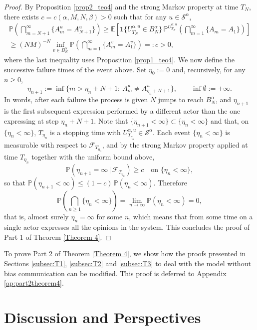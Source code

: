 \documentclass[11pt]{article}
\theoremstyle{definition}
\newcommand{\st}{\mathcal{S}}
\def\P{{\mathbb P}}
\begin{document}
\begin{proof}
By Proposition \ref{prop2_teo4} and the strong Markov property at time $T_N$, there exists $c=c(\alpha,M,N,\beta)>0$ such that for any $u\in \st^{\alpha}$,
\begin{multline*}
\P\left(\bigcap_{m=N+1}^{\infty}\{A_m^{u}=A_{N+1}^{u}\}\right) \geq
\mathbb{E}\left[\mathbf{1}\{U_{T_N}^{\alpha,u} \in B_N^{\alpha}\}\,
\P^{U_{T_N}^{\alpha,u}}\left(\bigcap_{m=1}^{\infty}\{A_m=A_1\}\right)\right]\\
\geq (NM)^{-N}\inf_{v \in B_N^{\alpha}}\P\left(\bigcap_{m=1}^{\infty}\{A^v_m=A^v_1\}\right)=:c>0,
\end{multline*}
where the last inequality uses Proposition \ref{prop1_teo4}. We now define the successive failure times of the event above. Set
$\eta_0 := 0$ and, recursively, for any $n \geq 0$,
\[
\eta_{n+1} := \inf\big\{ m > \eta_n + N + 1 :\ A^{u}_{m} \neq A^{u}_{\eta_n + N + 1} \big\},
\qquad \inf \emptyset := +\infty .
\]
In words, after each failure the process is given $N$ jumps to reach $B^{\alpha}_{N}$, and $\eta_{n+1}$ is the first subsequent expression performed by a different actor than the one expressing at step $\eta_n + N + 1$. Note that $\{\eta_{n+1} < \infty\} \subset \{\eta_n < \infty\}$ and that, on $\{\eta_n < \infty\}$, $T_{\eta_n}$ is a stopping time with $U^{\alpha,u}_{T_{\eta_n}} \in \mathcal{S}^{\alpha}$. Each event $\{\eta_n < \infty\}$ is measurable with respect to $\mathcal{F}_{T_{\eta_n}}$, and by the strong Markov property applied at time $T_{\eta_n}$ together with the uniform bound above,
\[
\mathbb{P}(\eta_{n+1} = \infty \,|\, \mathcal{F}_{T_{\eta_n}}) \geq c
\quad \text{on } \{\eta_n < \infty\},
\]
so that $\mathbb{P}(\eta_{n+1} < \infty) \leq (1-c)\, \mathbb{P}(\eta_n < \infty)$. Therefore
$$
\P\left(\bigcap_{n\geq 1}\{\eta_n<\infty\}\right)=\lim_{n\to\infty}\P(\eta_n<\infty)=0,
$$
that is, almost surely $\eta_n=\infty$ for some $n$, which means that from some time on a single actor expresses all the opinions in the system. This concludes the proof of Part 1 of Theorem \ref{Theorem 4}.
\end{proof}

To prove Part 2 of Theorem \ref{Theorem 4}, we show how the proofs presented in Sections \ref{subsec:T1}, \ref{subsec:T2} and \ref{subsec:T3}  to deal with the model without bias communication can be modified. This proof is deferred to Appendix \ref{ap:part2theorem4}.


\section{Discussion and Perspectives} \label{sec:discussion}
\end{document}
